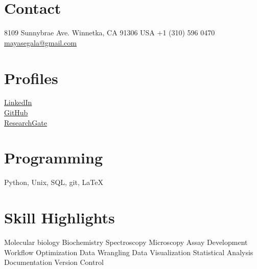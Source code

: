 \documentclass[Nunito,custcol]{friggeri-cv}                                       %
\begin{document}

\begin{asidep1}
\section{Contact}\vspace{2 mm}
8109 Sunnybrae Ave. 
Winnetka, CA 91306
USA \faMapMarker
+1 (310) 596 0470 \faPhone\\                                                      %
\href{mailto:mayasegala@gmail.com}{mayasegala@gmail.com}\vspace{2 mm}
\section{Profiles}\vspace{2 mm}
\href{https://www.linkedin.com/in/maya-segal-6a17ba16a}{LinkedIn \faLinkedin}\\                          %
\href{https://github.com/mayeshh?tab=repositories}{GitHub \faGithub}\\                                    %
\href{https://www.researchgate.net/profile/Maya-Segal}{ResearchGate \faUniversity}\\\vspace{2 mm}     %
\section{Programming}\vspace{2 mm}
Python, Unix, SQL, git, \LaTeX
\section{Skill Highlights}\vspace{2 mm}
Molecular biology
Biochemistry
Spectroscopy
Microscopy
Assay Development
Workflow Optimization
Data Wrangling
Data Visualization
Statistical Analysis
Documentation 
Version Control
\end{asidep1}
\end{document}
